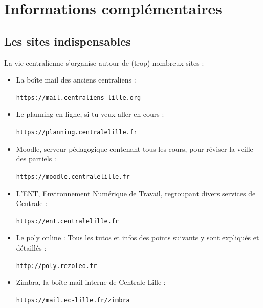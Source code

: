 \documentclass[12pt]{article}
\begin{document}
{\begin{description}
  \end{description}

\section{Informations complémentaires}

  \subsection{Les sites indispensables}
    La vie centralienne s’organise autour de (trop) nombreux sites :
    \newline
    \begin{itemize}
      \item La boîte mail des anciens centraliens :
      \begin{center}
	\verb|https://mail.centraliens-lille.org|
      \end{center}
    \item Le planning en ligne, si tu veux aller en cours :
    \begin{center}
      \verb|https://planning.centralelille.fr|
    \end{center}
    \item Moodle, serveur pédagogique contenant tous les cours, pour réviser la veille des partiels : 
    \begin{center}
      \verb|https://moodle.centralelille.fr|
    \end{center}
    \item L’ENT, Environnement Numérique de Travail, regroupant divers services de Centrale : 
    \begin{center}
      \verb|https://ent.centralelille.fr|
    \end{center}
    \item Le poly online : Tous les tutos et infos des points suivants y sont expliqués et détaillés : 
    \begin{center}
      \verb|http://poly.rezoleo.fr|
    \end{center}
    \item Zimbra, la boîte mail interne de Centrale Lille :
    \begin{center}
      \verb|https://mail.ec-lille.fr/zimbra|
    \end{center}
    \end{itemize}
}
\end{document}
